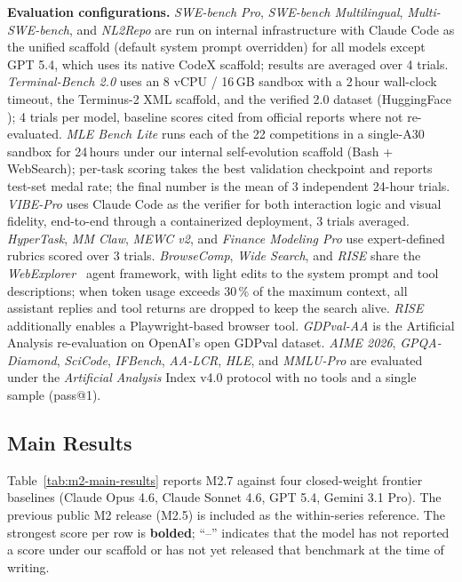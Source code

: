 \noindent \textbf{Evaluation configurations.} \emph{SWE-bench Pro}, \emph{SWE-bench Multilingual}, \emph{Multi-SWE-bench}, and \emph{NL2Repo} are run on internal infrastructure with Claude Code as the unified scaffold (default system prompt overridden) for all models except GPT 5.4, which uses its native CodeX scaffold; results are averaged over 4 trials. \emph{Terminal-Bench 2.0} uses an 8 vCPU / 16\,GB sandbox with a 2\,hour wall-clock timeout, the Terminus-2 XML scaffold, and the verified 2.0 dataset (HuggingFace ); 4 trials per model, baseline scores cited from official reports where not re-evaluated. \emph{MLE Bench Lite} runs each of the 22 competitions in a single-A30 sandbox for 24\,hours under our internal self-evolution scaffold (Bash + WebSearch); per-task scoring takes the best validation checkpoint and reports test-set medal rate; the final number is the mean of 3 independent 24-hour trials. \emph{VIBE-Pro} uses Claude Code as the verifier for both interaction logic and visual fidelity, end-to-end through a containerized deployment, 3 trials averaged. \emph{HyperTask}, \emph{MM Claw}, \emph{MEWC v2}, and \emph{Finance Modeling Pro} use expert-defined rubrics scored over 3 trials. \emph{BrowseComp}, \emph{Wide Search}, and \emph{RISE} share the \emph{WebExplorer}~\citep{liu2025webexplorer} agent framework, with light edits to the system prompt and tool descriptions; when token usage exceeds 30\,\% of the maximum context, all assistant replies and tool returns are dropped to keep the search alive. \emph{RISE} additionally enables a Playwright-based browser tool. \emph{GDPval-AA} is the Artificial Analysis re-evaluation on OpenAI's open GDPval dataset. \emph{AIME 2026}, \emph{GPQA-Diamond}, \emph{SciCode}, \emph{IFBench}, \emph{AA-LCR}, \emph{HLE}, and \emph{MMLU-Pro} are evaluated under the \emph{Artificial Analysis} Index v4.0 protocol with no tools and a single sample (pass@1).

\subsection{Main Results}

Table~\ref{tab:m2-main-results} reports M2.7 against four closed-weight frontier baselines (Claude Opus 4.6, Claude Sonnet 4.6, GPT 5.4, Gemini 3.1 Pro). The previous public M2 release (M2.5) is included as the within-series reference. The strongest score per row is \textbf{bolded}; ``--'' indicates that the model has not reported a score under our scaffold or has not yet released that benchmark at the time of writing.

